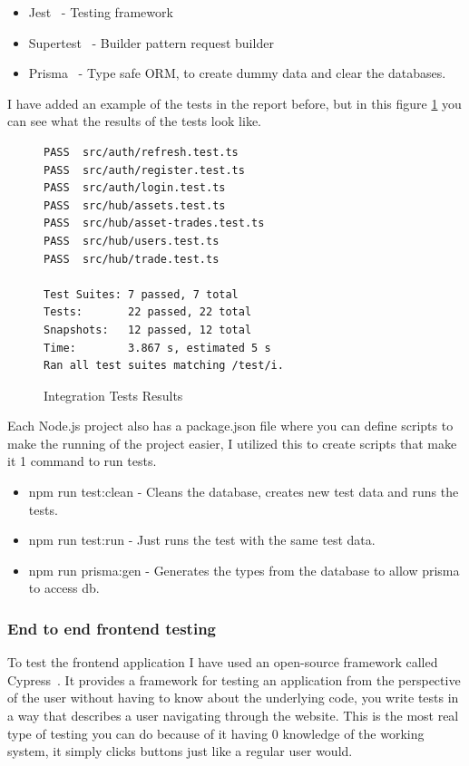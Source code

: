 \documentclass[titlepage]{article}
\begin{document}
\begin{itemize}
  \item Jest~\cite{jest} - Testing framework
  \item Supertest~\cite{supertest} - Builder pattern request builder
  \item Prisma~\cite{prisma} - Type safe ORM, to create dummy data and clear the databases.
\end{itemize}

I have added an example of the tests in the report before, but in this figure \ref{integration} you can see what the results of the tests look like.

\begin{figure}[h]
  \begin{verbatim}
PASS  src/auth/refresh.test.ts
PASS  src/auth/register.test.ts
PASS  src/auth/login.test.ts
PASS  src/hub/assets.test.ts
PASS  src/hub/asset-trades.test.ts
PASS  src/hub/users.test.ts
PASS  src/hub/trade.test.ts

Test Suites: 7 passed, 7 total
Tests:       22 passed, 22 total
Snapshots:   12 passed, 12 total
Time:        3.867 s, estimated 5 s
Ran all test suites matching /test/i.
  \end{verbatim}
  \caption{Integration Tests Results}
  \label{integration}
\end{figure}

Each Node.js project also has a package.json file where you can define scripts to make the running of the project easier, I utilized this to create scripts that make it 1 command to run tests.

\begin{itemize}
  \item npm run test:clean - Cleans the database, creates new test data and runs the tests.
  \item npm run test:run - Just runs the test with the same test data.
  \item npm run prisma:gen - Generates the types from the database to allow prisma to access db.
\end{itemize}

\subsubsection{End to end frontend testing}
To test the frontend application I have used an open-source framework called Cypress~\cite{cypress}. It provides a framework for testing an application from the perspective of the user without having to know about the underlying code, you write tests in a way that describes a user navigating through the website. This is the most real type of testing you can do because of it having 0 knowledge of the working system, it simply clicks buttons just like a regular user would. \\
\end{document}
